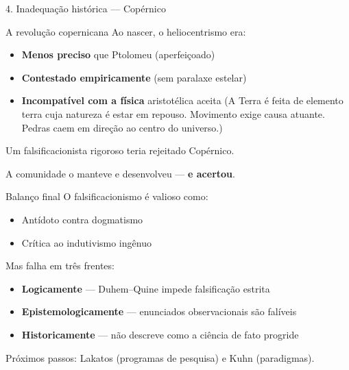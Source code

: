 \documentclass[aspectratio=169]{beamer}
\newcommand{\impt}[1]{\textcolor{maccent}{\textbf{#1}}}
\newcommand{\ntc}[1]{\textcolor{mprimary}{#1}}
\begin{document}
\begin{frame}{4. Inadequação histórica --- Copérnico}
\begin{block}{A revolução copernicana}
Ao nascer, o heliocentrismo era:
\begin{itemize}
  \item \impt{Menos preciso} que Ptolomeu (aperfeiçoado)
  \item \impt{Contestado empiricamente} (sem paralaxe estelar)
  \item \impt{Incompatível com a física} aristotélica aceita (A Terra é feita de elemento terra cuja natureza é estar em repouso. Movimento exige causa atuante. Pedras caem em direção ao centro do universo.)
\end{itemize}
\end{block}
\pause
\vspace{0.5cm}
\ntc{Um falsificacionista rigoroso teria rejeitado Copérnico.}
\pause
\vspace{0.3cm}
\begin{alertblock}{}
A comunidade o manteve e desenvolveu --- \impt{e acertou}.
\end{alertblock}
\end{frame}


\begin{frame}{Balanço final}
O falsificacionismo é valioso como:
\vspace{0.2cm}
\begin{itemize}
  \item Antídoto contra dogmatismo
  \item Crítica ao indutivismo ingênuo
\end{itemize}
\pause
\vspace{0.4cm}
Mas falha em três frentes:
\vspace{0.2cm}
\pause
\begin{itemize}
  \item \impt{Logicamente} --- Duhem--Quine impede falsificação estrita
  \pause
  \item \impt{Epistemologicamente} --- enunciados observacionais são falíveis
  \pause
  \item \impt{Historicamente} --- não descreve como a ciência de fato progride
\end{itemize}
\pause
\vspace{0.4cm}
\ntc{Próximos passos:} Lakatos (programas de pesquisa) e Kuhn (paradigmas).
\end{frame}

\end{document}
